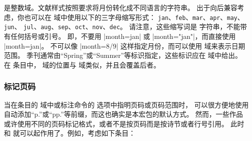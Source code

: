  是整数域。文献样式按照要求将月份转化成不同语言的字符串。
出于向后兼容考虑，你也可以在  域中使用以下的三字母缩写形式：
\texttt{jan}、\texttt{feb}、\texttt{mar}、\texttt{apr}、\texttt{may}、\texttt{jun}、
\texttt{jul}、\texttt{aug}、\texttt{sep}、\texttt{oct}、\texttt{nov}、\texttt{dec}。
请注意，这些缩写词是 \BibTeX 字符串，不能带有任何括号或引号。
即，不要用 |month={jan}| 或 |month="jan"|，而直接使用 |month=jan|。
不可以像 |month={8/9}| 这样指定月份，而可以使用  域来表示日期范围。
季刊通常由“Spring”或“Summer”等标识指定，这些标识应在  域中给出。
在  条目中， 域的位置与  域类似，并且会覆盖后者。

\subsubsection{标记页码}
\label{bib:use:pag}

当在条目的  域中或标注命令的  选项中指明页码或页码范围时，
可以很方便地使用 \biblatex 自动添加“p.”或“pp.”等前缀，而这也确实是本宏包的默认方式。
然而，一些作品或许使用不同的页码标记格式，或者不是按页码而是按诗节或者行号引用。
此时  和  就可以起作用了。例如，考虑如下条目：

